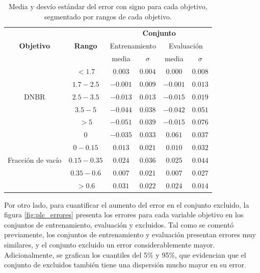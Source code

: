 \begin{table}[H]
	\centering
	\caption{Media y desvío estándar del error con signo para cada objetivo, segmentado por rangos de cada objetivo.}
	\begin{tabular}{c c c c c c} 
        \toprule
        \multirow{3}{1.5cm}{\textbf{Objetivo}} & \multirow{3}{*}{\textbf{Rango}} & \multicolumn{4}{c}{\textbf{Conjunto}} \\
        &                                               & \multicolumn{2}{c}{Entrenamiento} & \multicolumn{2}{c}{Evaluación} \\ 
        &                                               & media & $\sigma$  & media & $\sigma$  \\
        \multirow{5}{1.5cm}{DNBR}               
                        &$   <1.7$  & $0.003$ &   $0.004$   & $0.000$ &  $0.008$    \\ 
                        &$1.7-2.5$  & $-0.001$&   $0.009$   & $-0.001$&  $0.013$    \\
                        &$2.5-3.5$  & $-0.013$&   $0.013$   & $-0.015$&  $0.019$    \\
                        &$  3.5-5$  & $-0.044$&   $0.038$   & $-0.042$&  $0.051$    \\
                        &$     >5$  & $-0.051$&   $0.039$   & $-0.015$&  $0.076$    \\
        \hline
        \multirow{5}{1.5cm}{Fracción de vacío}
                        &$        0$  & $-0.035$ & $0.033$ & $0.061$ & $0.037$ \\ 
                        &$   0-0.15$  &  $0.013$ & $0.021$ & $0.010$ & $0.032$ \\
                        &$0.15-0.35$  &  $0.024$ & $0.036$ & $0.025$ & $0.044$ \\
                        &$ 0.35-0.6$  &  $0.007$ & $0.021$ & $0.007$ & $0.027$ \\
                        &$     >0.6$  &  $0.031$ & $0.022$ & $0.024$ & $0.014$ \\

		\bottomrule
	\end{tabular}
	\label{tab:plc_errors_dnbr_vacio_segmentado}
\end{table}

Por otro lado, para cuantificar el aumento del error en el conjunto excluido, la figura \ref{fig:plc_errores} presenta los errores para cada variable objetivo en los conjuntos de entrenamiento, evaluación y excluidos. Tal como se comentó previamente, los conjuntos de entrenamiento y evaluación presentan errores muy similares, y el conjunto excluido un error considerablemente mayor. Adicionalmente, se grafican los cuantiles del 5\% y 95\%, que evidencian que el conjunto de excluidos también tiene una dispersión mucho mayor en su error.

